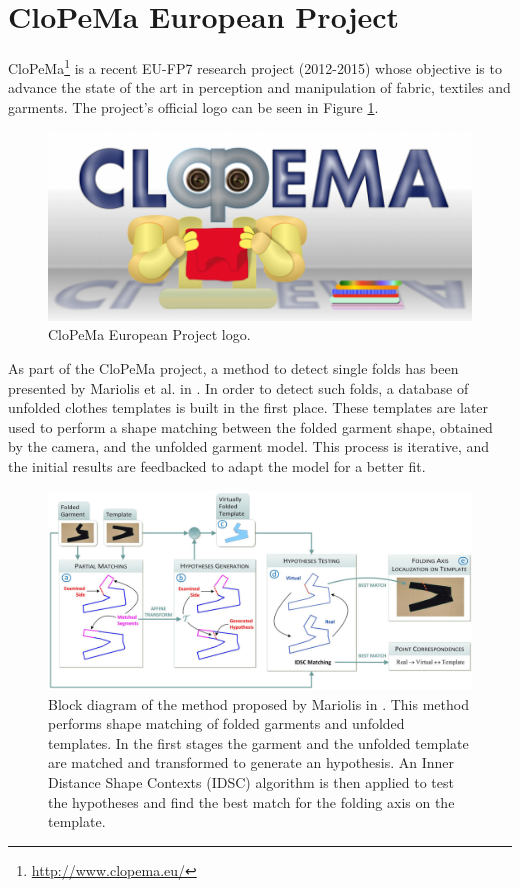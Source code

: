 \section{CloPeMa European Project}
\label{sota:clopema}

CloPeMa\footnote{\url{http://www.clopema.eu/}} is a recent EU-FP7 research project (2012-2015) whose objective is to advance the state of the art in perception and manipulation of fabric, textiles and garments. The project's official logo can be seen in Figure \ref{fig:SOTA_CloPeMa_logo}.

\begin{figure}[thpb]
    \centering
    \includegraphics[width=0.7
    \textwidth]{figures/SOTA_CloPeMa_logo.png}
    \caption{CloPeMa European Project logo.}
    \label{fig:SOTA_CloPeMa_logo}
\end{figure}

 As part of the CloPeMa project, a method to detect single folds has been presented by Mariolis et al. in \cite{Mariolis2013, Mariolis2015}. In order to detect such folds, a database of unfolded clothes templates is built in the first place. These templates are later used to perform a shape matching between the folded garment shape, obtained by the camera, and the unfolded garment model. This process is iterative, and the initial results are feedbacked to adapt the model for a better fit. 

\begin{figure}[thpb]
    \centering
    \includegraphics[width=\textwidth]{figures/SOTA_Mariolis_2015.png}
    \caption[dummy]{Block diagram of the method proposed by Mariolis in \cite{Mariolis2015}. This method performs shape matching of folded garments and unfolded templates. In the first stages the garment and the unfolded template are matched and transformed to generate an hypothesis. An Inner Distance Shape Contexts (IDSC) algorithm is then applied to test the hypotheses and find the best match for the folding axis on the template.}
    \label{fig:SOTA_Mariolis_2015}
\end{figure}

